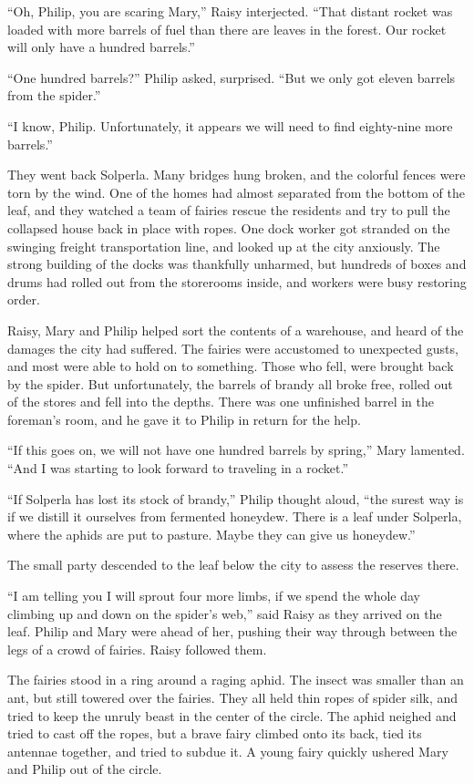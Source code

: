 \documentclass[10pt, draft]{memoir}
\begin{document}
``Oh, Philip, you are scaring Mary,'' Raisy interjected. ``That distant rocket was loaded with more barrels of fuel than there are leaves in the forest. Our rocket will only have a hundred barrels.''

``One hundred barrels?'' Philip asked, surprised. ``But we only got eleven barrels from the spider.''

``I know, Philip. Unfortunately, it appears we will need to find eighty-nine more barrels.''

They went back Solperla. Many bridges hung broken, and the colorful fences were torn by the wind. One of the homes had almost separated from the bottom of the leaf, and they watched a team of fairies rescue the residents and try to pull the collapsed house back in place with ropes. One dock worker got stranded on the swinging freight transportation line, and looked up at the city anxiously. The strong building of the docks was thankfully unharmed, but hundreds of boxes and drums had rolled out from the storerooms inside, and workers were busy restoring order.

Raisy, Mary and Philip helped sort the contents of a warehouse, and heard of the damages the city had suffered. The fairies were accustomed to unexpected gusts, and most were able to hold on to something. Those who fell, were brought back by the spider. But unfortunately, the barrels of brandy all broke free, rolled out of the stores and fell into the depths. There was one unfinished barrel in the foreman's room, and he gave it to Philip in return for the help.

``If this goes on, we will not have one hundred barrels by spring,'' Mary lamented. ``And I was starting to look forward to traveling in a rocket.''

``If Solperla has lost its stock of brandy,'' Philip thought aloud, ``the surest way is if we distill it ourselves from fermented honeydew. There is a leaf under Solperla, where the aphids are put to pasture. Maybe they can give us honeydew.''

The small party descended to the leaf below the city to assess the reserves there.

``I am telling you I will sprout four more limbs, if we spend the whole day climbing up and down on the spider's web,'' said Raisy as they arrived on the leaf. Philip and Mary were ahead of her, pushing their way through between the legs of a crowd of fairies. Raisy followed them.

The fairies stood in a ring around a raging aphid. The insect was smaller than an ant, but still towered over the fairies. They all held thin ropes of spider silk, and tried to keep the unruly beast in the center of the circle. The aphid neighed and tried to cast off the ropes, but a brave fairy climbed onto its back, tied its antennae together, and tried to subdue it. A young fairy quickly ushered Mary and Philip out of the circle.
\end{document}

